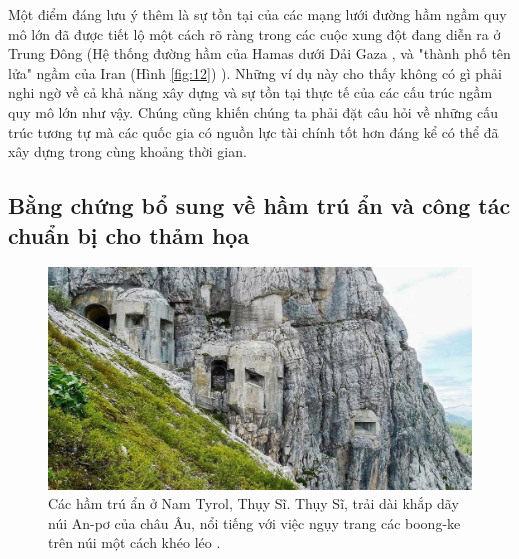 Một điểm đáng lưu ý thêm là sự tồn tại của các mạng lưới đường hầm ngầm quy mô lớn đã được tiết lộ một cách rõ ràng trong các cuộc xung đột đang diễn ra ở Trung Đông (Hệ thống đường hầm của Hamas dưới Dải Gaza \cite{38}, và "thành phố tên lửa" ngầm của Iran (Hình \ref{fig:12}) \cite{39,40}). Những ví dụ này cho thấy không có gì phải nghi ngờ về cả khả năng xây dựng và sự tồn tại thực tế của các cấu trúc ngầm quy mô lớn như vậy. Chúng cũng khiến chúng ta phải đặt câu hỏi về những cấu trúc tương tự mà các quốc gia có nguồn lực tài chính tốt hơn đáng kể có thể đã xây dựng trong cùng khoảng thời gian.

\subsection{Bằng chứng bổ sung về hầm trú ẩn và công tác chuẩn bị cho thảm họa}

\begin{figure}[t]
\begin{center}
   \includegraphics[width=1\linewidth]{tyrol.jpg}
\end{center}
   \caption{Các hầm trú ẩn ở Nam Tyrol, Thụy Sĩ. Thụy Sĩ, trải dài khắp dãy núi An-pơ của châu Âu, nổi tiếng với việc ngụy trang các boong-ke trên núi một cách khéo léo \cite{32}.}
\label{fig:7}
\label{fig:onecol}
\end{figure}

